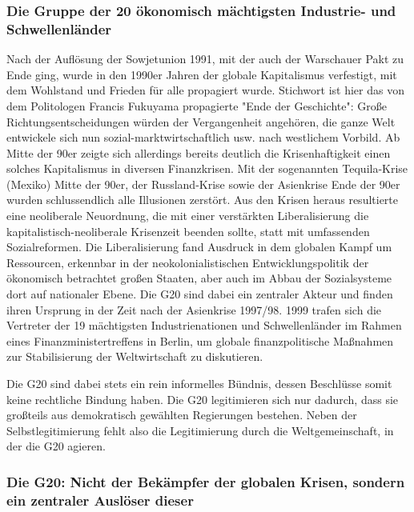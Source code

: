 \documentclass[ngerman,headheight=70pt]{scrartcl}
\begin{document}
    \subsubsection*{Die Gruppe der 20 ökonomisch mächtigsten  Industrie- und
    Schwellenländer}

    Nach der Auflösung der Sowjetunion 1991, mit der auch der Warschauer Pakt zu
    Ende ging, wurde in den 1990er Jahren der globale Kapitalismus verfestigt,
    mit dem Wohlstand und Frieden für alle propagiert wurde. Stichwort ist hier
    das von dem Politologen Francis Fukuyama propagierte "Ende der Geschichte":
    Große Richtungsentscheidungen würden der Vergangenheit angehören, die ganze
    Welt entwickele sich nun sozial-marktwirtschaftlich usw. nach westlichem
    Vorbild. Ab Mitte der 90er zeigte sich allerdings bereits deutlich die
    Krisenhaftigkeit einen solches Kapitalismus in diversen Finanzkrisen. Mit
    der sogenannten Tequila-Krise (Mexiko) Mitte der 90er, der Russland-Krise
    sowie der Asienkrise Ende der 90er wurden schlussendlich alle Illusionen
    zerstört. Aus den Krisen heraus resultierte eine neoliberale Neuordnung, die
    mit einer verstärkten Liberalisierung die kapitalistisch-neoliberale
    Krisenzeit beenden sollte, statt mit umfassenden Sozialreformen. Die
    Liberalisierung fand Ausdruck in dem globalen Kampf um Ressourcen, erkennbar
    in der neokolonialistischen Entwicklungspolitik der ökonomisch betrachtet
    großen Staaten, aber auch im Abbau der Sozialsysteme dort auf nationaler
    Ebene. Die G20 sind dabei ein zentraler Akteur und finden ihren Ursprung in
    der Zeit nach der Asienkrise 1997/98. 1999 trafen sich die Vertreter der 19
    mächtigsten Industrienationen und Schwellenländer im Rahmen eines
    Finanzministertreffens in Berlin, um globale finanzpolitische Maßnahmen zur
    Stabilisierung der Weltwirtschaft zu diskutieren.

    Die G20 sind dabei stets ein rein informelles Bündnis, dessen Beschlüsse somit
    keine rechtliche Bindung haben. Die G20 legitimieren sich nur dadurch, dass
    sie großteils aus demokratisch gewählten Regierungen bestehen. Neben der
    Selbstlegitimierung fehlt also die Legitimierung durch die Weltgemeinschaft,
    in der die G20 agieren.

    \subsubsection*{Die G20: Nicht der Bekämpfer der globalen Krisen, sondern ein
    zentraler Auslöser dieser}
\end{document}

